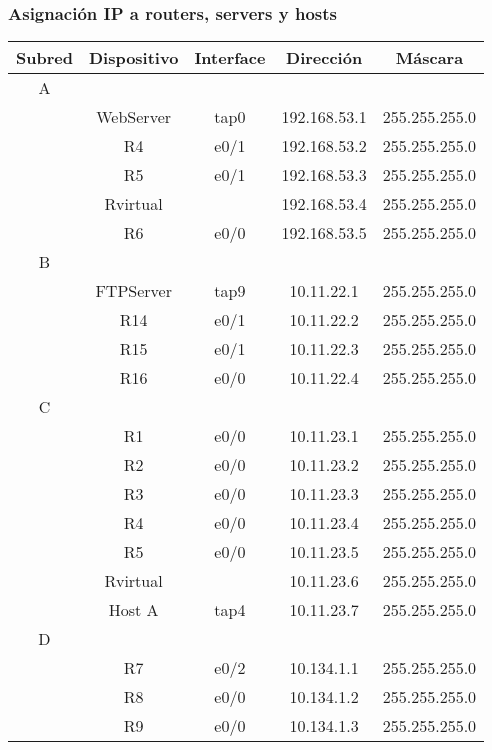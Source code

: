 \documentclass[12pt, a4paper, spanish]{article}
\begin{document}
\subsubsection{Asignación IP a routers, servers y hosts}
\begin{center}
\begin{tabular}{|c|c|c|c|c|}
	\hline
	Subred & Dispositivo & Interface & Dirección & Máscara \\
	\hline
	\hline
	A & & & & \\
	\hline
	 & WebServer 	& tap0 	& 192.168.53.1 	& 255.255.255.0 \\
	\hline
	 & R4 			& e0/1 	& 192.168.53.2 	& 255.255.255.0 \\
	\hline
	 & R5 			& e0/1 	& 192.168.53.3 	& 255.255.255.0 \\
	\hline
	 & Rvirtual 		& 		& 192.168.53.4 	& 255.255.255.0 \\
	\hline
	 & R6 			& e0/0 	& 192.168.53.5 	& 255.255.255.0 \\
	\hline
	\hline
	B & & & & \\
	\hline
	 & FTPServer 	& tap9 	& 10.11.22.1 	& 255.255.255.0 \\
	\hline
	 & R14 			& e0/1 	& 10.11.22.2 	& 255.255.255.0 \\
	\hline
	 & R15 			& e0/1  & 10.11.22.3 	& 255.255.255.0 \\
	\hline
	 & R16 			& e0/0 	& 10.11.22.4 	& 255.255.255.0 \\
	\hline
	\hline
	C & & & & \\
	\hline
	 & R1 			& e0/0 	& 10.11.23.1 	& 255.255.255.0 \\
	\hline
	 & R2 			& e0/0 	& 10.11.23.2 	& 255.255.255.0 \\
	\hline
	 & R3 			& e0/0 	& 10.11.23.3 	& 255.255.255.0 \\
	\hline
	 & R4 			& e0/0 	& 10.11.23.4 	& 255.255.255.0 \\
	\hline
	 & R5 			& e0/0 	& 10.11.23.5 	& 255.255.255.0 \\
	\hline
	 & Rvirtual 		& 		& 10.11.23.6 	& 255.255.255.0 \\
	\hline
	 & Host A 		& tap4 	& 10.11.23.7 	& 255.255.255.0 \\
	\hline
	\hline
	D & & & & \\
	\hline
	 & R7 			& e0/2 	& 10.134.1.1 	& 255.255.255.0 \\
	\hline
	 & R8 			& e0/0  & 10.134.1.2 	& 255.255.255.0 \\
	\hline
	 & R9 			& e0/0 	& 10.134.1.3 	& 255.255.255.0 \\

\end{tabular}
\end{center}
\end{document}
